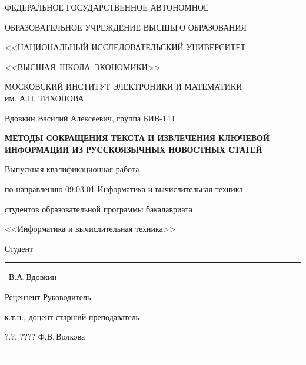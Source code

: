 
\begin{titlepage}
	\begin{center}
		ФЕДЕРАЛЬНОЕ ГОСУДАРСТВЕННОЕ АВТОНОМНОЕ
		
		ОБРАЗОВАТЕЛЬНОЕ УЧРЕЖДЕНИЕ ВЫСШЕГО ОБРАЗОВАНИЯ
		
		<<НАЦИОНАЛЬНЫЙ ИССЛЕДОВАТЕЛЬСКИЙ УНИВЕРСИТЕТ
		
		<<ВЫСШАЯ~ШКОЛА~ЭКОНОМИКИ>>
		\vspace{1cm}
		
		МОСКОВСКИЙ ИНСТИТУТ ЭЛЕКТРОНИКИ И МАТЕМАТИКИ\\  
		им. А.Н. ТИХОНОВА
		\vspace{1cm}
		
		Вдовкин Василий Алексеевич, группа БИВ-144
		
		\vspace{1cm}
		
		\MakeUppercase{\textbf{Методы сокращения текста и извлечения ключевой информации из русскоязычных новостных статей}}
		
		\vspace{1cm}
		
		Выпускная квалификационная работа 
		
		по направлению 09.03.01 Информатика и вычислительная техника 
		
		студентов образовательной программы бакалавриата
		
		<<Информатика и вычислительная техника>>
		
	\end{center}
  	\vspace{1cm}
  	\begin{flushright}
  		Студент~\rule{4cm}{.1pt}~В.А.\,Вдовкин
  	\end{flushright}
  	\vspace{1cm}
  	\begin{flushleft}
  		Рецензент \hfill  Руководитель
  		
  		к.т.н., доцент \hfill старший преподаватель
  		
  		?.?. ???? \hfill Ф.В.\,Волкова
  		
  		\rule{4cm}{.1pt} \hfill \rule{4cm}{.1pt}
  		
  	\end{flushleft}
  	\vfill{}
\end{titlepage}
